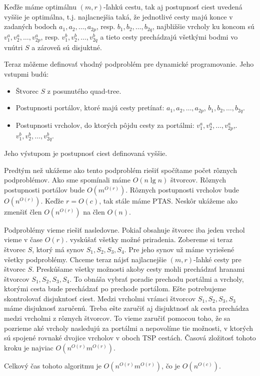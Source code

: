 Keďže máme optimálnu $(m,r)$-ľahkú cestu, tak aj postupnosť ciest uvedená vyššie je optimálna, t.j.
najlacnejšia taká, že jednotlivé cesty majú konce v zadaných bodoch $a_1, a_2, \dots, a_{2p}$, resp. $b_1, b_2,
\dots, b_{2q}$, najbližšie vrcholy ku koncom sú $v^a_1, v^a_2, \dots, v^a_{2p}$, resp.
$v^b_1, v^b_2, \dots, v^b_{2q}$ a tieto cesty prechádzajú všetkými bodmi vo vnútri $S$ a zároveň sú
disjuktné.

Teraz môžeme definovať vhodný podproblém pre dynamické programovanie. Jeho vstupmi budú:
\begin{itemize}
\item Štvorec $S$ z posunutého quad-tree.
\item Postupnosti portálov, ktoré majú cesty pretínať: $a_1, a_2, \dots, a_{2p}$, $b_1, b_2, \dots,
b_{2q}$.
\item Postupnosti vrcholov, do ktorých pôjdu cesty za portálmi: $v^a_1, v^a_2, \dots, v^a_{2p}$,.
$v^b_1, v^b_2, \dots, v^b_{2q}$.
\end{itemize}

Jeho výstupom je postupnosť ciest definovaná vyššie.

Predtým než ukážeme ako tento podproblém riešiť spočítame počet rôznych podproblémov.
Ako sme spomínali máme $O(n \lg n)$ štvorcov. Rôznych postupnosti portálov bude $O(m^{O(r)})$.
Rôznych postupnosti vrcholov bude $O(n^{O(r)})$. Keďže $r = O(c)$, tak stále
máme PTAS. Neskôr ukážeme ako zmenšiť člen $O(n^{O(r)})$ na člen $O(n)$.

Podproblémy vieme riešiť nasledovne. Pokiaľ obsahuje štvorec iba jeden vrchol vieme v čase $O(r)$. vyskúšať všetky
možné priradenia. Zobereme si teraz štvorec $S$, ktorý má synov $S_1, S_2, S_3, S_4$. Pre jeho synov
už máme vyriešené všetky podproblémy. Chceme teraz nájsť najlacnejšie $(m, r)$-ľahké cesty pre
štvorec $S$. Preskúšame všetky možnosti akoby cesty mohli prechádzať hranami štvorcov $S_1, S_2,
S_3, S_4$. To obnáša vybrať poradie prechodu portálmi a vrcholy, ktorými cesta bude prechádzať po
prechode portálom. Ešte potrebujeme skontrolovať disjukntosť ciest. Medzi vrcholmi vrámci štvorcov
$S_1, S_2, S_3, S_3$ máme disjuknosť zaručenú. Treba ešte zaručiť aj disjuktnosť ak cesta prechádza
medzi vrcholmi z rôznych štvorcov. To vieme zaručiť pomocou toho, že sa pozrieme aké vrcholy
nasledujú za portálmi a nepovolíme tie možnosti, v ktorých sú spojené rovnaké dvojice vrcholov v
oboch TSP cestách. Časová zložitosť tohoto kroku je najviac $O(n^{O(r)} m^{O(r)})$.

Celkový čas tohoto algoritmu je $O(n^{O(r)} m^{O(r)})$, čo je $O(n^{O(c)})$.

